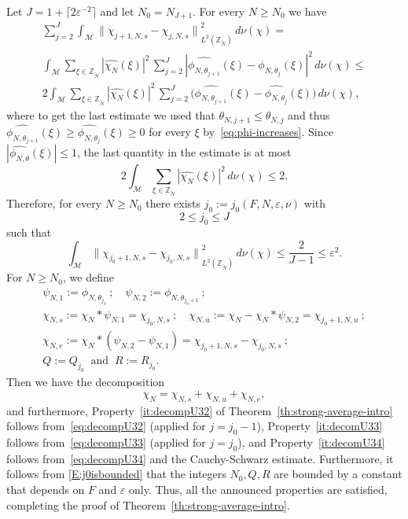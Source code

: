 \documentclass[11pt]{amsart}
\theoremstyle{definition}
\begin{document}
Let $J=1+\lceil 2{\varepsilon}^{-2}\rceil$ and let $N_0=N_{J+1}$. For every
$N\geq N_0$ we have
\begin{multline*}
\sum_{j=2}^J\int_{{\mathcal M}}
{\lVert {\chi_{j+1,N,s}-\chi_{j,N,s}} \rVert}_{L^2({{{\mathbb Z}}_{\widetilde N}})}^2\,d\nu(\chi)=\\
\int_{{\mathcal M}} \sum_{\xi\in{{{\mathbb Z}}_{\widetilde N}}} |\widehat{\chi_N}(\xi)|^2 \,\sum_{j=2}^J
|\widehat{\phi_{N,\theta_{j+1}}}(\xi)-\widehat{\phi_{N,\theta_{j}}}(\xi)|^2\,d\nu(\chi)
\leq\\
 2 \int_{{\mathcal M}} \sum_{\xi\in{{{\mathbb Z}}_{\widetilde N}}}|\widehat{\chi_N}(\xi)|^2
\,\sum_{j=2}^J
\bigl(\widehat{\phi_{N,\theta_{j+1}}}(\xi)-\widehat{\phi_{N,\theta_j}}(\xi)\bigr)\,d\nu(\chi),
\end{multline*}
where to get the last estimate we used that  $\theta_{N,j+1} \leq
\theta_{N,j}$ and thus
$\widehat{\phi_{N,\theta_{j+1}}}(\xi)\geq\widehat{\phi_{N,\theta_j}}(\xi)\geq
0$ for every $\xi$ by~\eqref{eq:phi-increases}. Since
$|\widehat{\phi_{N,\theta}}(\xi)|\leq 1$, the last quantity in the
estimate is  at most
$$
 2\int_{{\mathcal M}} \sum_{\xi\in {{{\mathbb Z}}_{\widetilde N}}} |\widehat{\chi_N}(\xi)|^2 \, d\nu(\chi)\leq 2.
$$
Therefore,  for every $N\geq N_0$ there exists $j_0:=j_0(F,N,{\varepsilon},
\nu)$ with
\begin{equation}\label{E:j0isbounded}
2\leq j_0\leq J
\end{equation} such that
\begin{equation}
\label{eq:decompU34} \int_{{\mathcal M}}
{\lVert {\chi_{j_0+1,N,s}-\chi_{j_0,N,s}} \rVert}_{L^2({{{\mathbb Z}}_{\widetilde N}})}^2\,d\nu(\chi)\leq
\frac 2{J-1}\leq {\varepsilon}^2.
\end{equation}
 For   $N\geq N_0$, we  define
\begin{gather*}
\psi_{N,1}:= \phi_{N,\theta_{j_0}}\ ;\quad \psi_{N,2}:=\phi_{N,\theta_{j_0+1}}\ ;\\
 \chi_{N,s}:=\chi_N*\psi_{N,1}=\chi_{j_0,N,s}\ ;\quad
 \chi_{N,u}:=\chi_N-\chi_N*\psi_{N,2}= \chi_{j_0+1,N,u}\ ;\\
\chi_{N,e}:=\chi_N*(\psi_{N,2}-\psi_{N,1})= \chi_{j_0+1,N,s}-\chi_{j_0,N,s}\ ;\\
Q:=Q_{j_0}\ \text{ and }\ R:=R_{j_0}.
\end{gather*}
Then we have the decomposition
$$
\chi_N=\chi_{N,s}+\chi_{N,u} +\chi_{N,e},
$$
and furthermore, Property~\eqref{it:decompU32} of Theorem~\ref{th:strong-average-intro} follows from~\eqref{eq:decompU32} (applied for $j=j_0-1$),
 Property~\eqref{it:decomU33} follows from~\eqref{eq:decompU33} (applied for $j=j_0$),  and Property~\eqref{it:decomU34}
 follows from~\eqref{eq:decompU34} and the Cauchy-Schwarz
 estimate. Furthermore, it follows from \eqref{E:j0isbounded} that the integers $N_0,Q,R$  are bounded by a  constant that depends on $F$ and ${\varepsilon}$ only.
 Thus, all the announced properties are satisfied,
completing the proof of Theorem~\ref{th:strong-average-intro}.
{}
\end{document}
